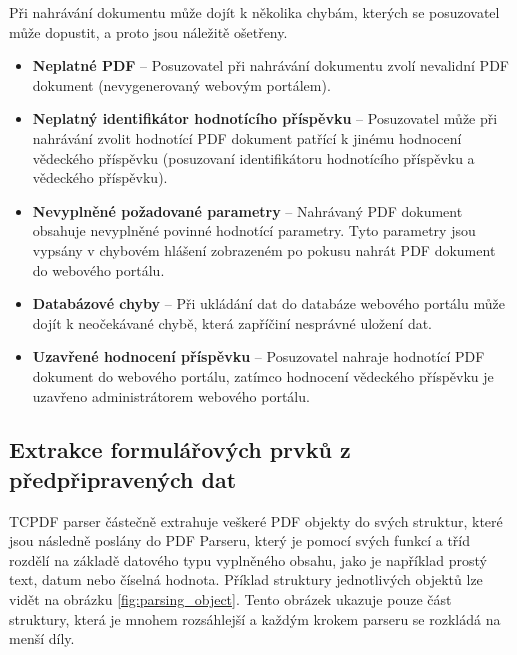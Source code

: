 \par
Při nahrávání dokumentu může dojít k několika chybám, kterých se posuzovatel může dopustit, a proto jsou náležitě ošetřeny.
\begin{itemize}
	\item \textbf{Neplatné PDF} -- Posuzovatel při nahrávání dokumentu zvolí nevalidní PDF dokument (nevygenerovaný webovým portálem).
	\item \textbf{Neplatný identifikátor hodnotícího příspěvku} -- Posuzovatel může při nahrávání zvolit hodnotící PDF dokument patřící k jinému hodnocení vědeckého příspěvku (posuzovaní identifikátoru hodnotícího příspěvku a vědeckého příspěvku).
	\item \textbf{Nevyplněné požadované parametry} -- Nahrávaný PDF dokument obsahuje nevyplněné povinné hodnotící parametry. Tyto parametry jsou vypsány v chybovém hlášení zobrazeném po pokusu nahrát PDF dokument do webového portálu.
	\item \textbf{Databázové chyby} -- Při ukládání dat do databáze webového portálu může dojít k neočekávané chybě, která zapříčiní nesprávné uložení dat. 
	\item \textbf{Uzavřené hodnocení příspěvku} -- Posuzovatel nahraje hodnotící PDF dokument do webového portálu, zatímco hodnocení vědeckého příspěvku je uzavřeno administrátorem webového portálu.
\end{itemize}

\subsection{Extrakce formulářových prvků z předpřipravených dat}
TCPDF parser částečně extrahuje veškeré PDF objekty do svých struktur, které jsou následně poslány do PDF Parseru, který je pomocí svých funkcí a tříd rozdělí na základě datového typu vyplněného obsahu, jako je například prostý text, datum nebo číselná hodnota. Příklad struktury jednotlivých objektů lze vidět na obrázku \ref{fig:parsing_object}. Tento obrázek ukazuje pouze část struktury, která je mnohem rozsáhlejší a každým krokem parseru se rozkládá na menší díly.

